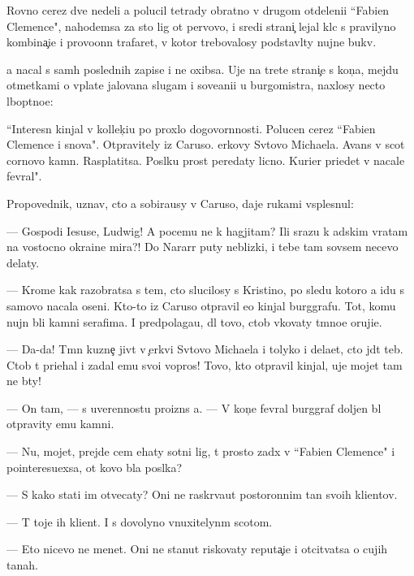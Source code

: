 \documentclass[10pt]{book}
\begin{document}
Rovno cerez dve nedeli {\y}a polucil tetrady obratno v drugom otdeleni{\y}i ``Fabien Clemence", nahod{\ia}{\x}emsa za sto lig ot pervovo, i sredi strani{\c} lejal kl{\io}c s pravilyno{\y} kombina{\c}i{\y}e{\y} i provo{\x}onn{\yi}{\y} trafaret, v kotor{\yi}{\y} trebovalosy podstavl{\ia}ty nujn{\yi}{\y}e bukv{\yi}.

{\Y}a nacal s sam{\yi}h poslednih zapise{\y} i ne oxibsa. Uje na tret{\y}e{\y} strani{\c}e s kon{\c}a, mejdu otmetkami o v{\yi}plate jalovan{\y}a slugam i sove{\x}ani{\y}i u burgomistra, naxlosy necto l{\io}bop{\yi}tno{\y}e:

``Interesn{\yi}{\y} kinjal v kollek{\c}i{\y}u po proxlo{\y} dogovor{\e}nnosti. Polucen cerez ``Fabien Clemence i s{\yi}nov{\y}a". Otpravitely iz Caruso. {\C}erkovy Sv{\ia}tovo Michaela. Avans v scot cornovo kamn{\ia}. Rasplatitsa. Pos{\yi}lku pros{\ia}t peredaty licno. Kurier pri{\y}edet v nacale fevral{\ia}".



Pro\-po\-ved\-nik, uznav, cto {\y}a sobira{\y}usy v Caruso, daje rukami vsplesnul:

— Gospodi Iesuse, Ludwig! A pocemu ne k hagjitam? Ili srazu k adskim vratam na vostocno{\y} okra{\y}ine mira?! Do Nararr{\yi} puty neblizki{\y}, i tebe tam sovsem necevo delaty.

— Krome kak razobratsa s tem, cto slucilosy s Kristino{\y}, po sledu kotoro{\y} {\y}a idu s samovo nacala oseni. Kto-to iz Caruso otpravil {\y}e{\y}o kinjal burggrafu. Tot, komu nujn{\yi} b{\yi}li kamni serafima. I predpolaga{\y}u, dl{\ia} tovo, ctob{\yi} v{\yi}kovaty t{\e}mno{\y}e oruji{\y}e.

— Da-da! T{\e}mn{\yi}{\y} kuzne{\c} jiv{\e}t v {\c}erkvi Sv{\ia}tovo Michaela i tolyko i dela{\y}et, cto jd{\e}t teb{\ia}. Ctob{\yi} t{\yi} pri{\y}ehal i zadal {\y}emu svo{\y}i vopros{\yi}! Tovo, kto otpravil kinjal, uje mojet tam ne b{\yi}ty!

— On tam, — s uverennost{\y}u proizn{\e}s {\y}a. — V kon{\c}e fevral{\ia} burggraf doljen b{\yi}l otpravity {\y}emu kamni.

— Nu, mojet, prejde cem {\y}ehaty sotni lig, t{\yi} prosto za{\y}d{\e}x v ``Fabien Clemence" i pointeresu{\y}exsa, ot kovo b{\yi}la pos{\yi}lka?

— S kako{\y} stati im otvecaty? Oni ne raskr{\yi}va{\y}ut postoronnim ta{\y}n{\yi} svo{\y}ih klientov.

— T{\yi} toje ih klient. I s dovolyno vnuxitelyn{\yi}m scotom.

— Eto nicevo ne men{\ia}{\y}et. Oni ne stanut riskovaty reputa{\c}i{\y}e{\y} i otcit{\yi}vatsa o cujih ta{\y}nah.
\end{document}
